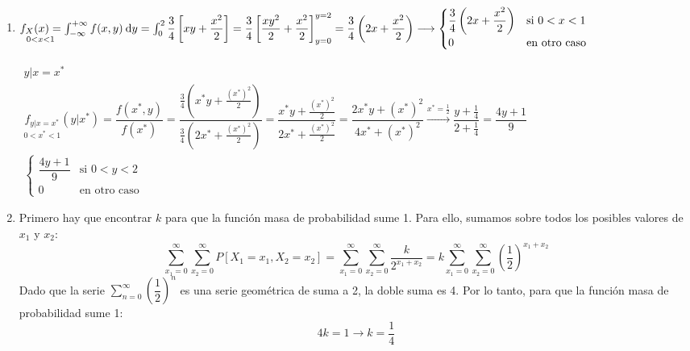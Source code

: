 \begin{enumerate}[label=\color{red}\arabic*), leftmargin=*]
	\item {}
	
	
	$\underset{0<x<1}{f_X(x)=}\int_{-\infty}^{+\infty}f(x,y)\:\mathrm{d}y=\int_{0}^{2}\dfrac{3}{4}\left[xy+\dfrac{x^2}{2}\right]=\dfrac{3}{4}\left[\dfrac{xy^2}{2}+\dfrac{x^2}{2}\right]_{y=0}^{y=2}=\dfrac{3}{4}\left(2x+\dfrac{x^2}{2}\right)\longrightarrow\begin{cases}
	\dfrac{3}{4}\left(2x+\dfrac{x^2}{2}\right) & \text{si }0<x<1\\
	0 & \text{en otro caso}
	\end{cases}$
	
	$\begin{array}{l}
	y|x=x^*\\
	\underset{0<x^*<1}{f_{y|x=x^*}}(y|x^*)=\dfrac{f(x^*,y)}{f(x^*)}=\dfrac{\frac{3}{4}\left(x^*y+\frac{(x^*)^2}{2}\right)}{\frac{3}{4}\left(2x^*+\frac{(x^*)^2}{2}\right)}=\dfrac{x^*y+\frac{(x^*)^2}{2}}{2x^*+\frac{(x^*)^2}{2}}=\dfrac{2x^*y+(x^*)^2}{4x^*+(x^*)^2}\xrightarrow{x^*=\frac{1}{2}}\dfrac{y+\frac{1}{4}}{2+\frac{1}{4}}=\dfrac{4y+1}{9}\\
	\begin{cases}
	\dfrac{4y+1}{9} & \text{si }0<y<2\\
	0 & \text{en otro caso}
	\end{cases}
	\end{array}$
	\item {}
	
	Primero hay que encontrar $k$ para que la función masa de probabilidad sume 1. Para ello, sumamos sobre todos los posibles valores de $x_1$ y $x_2$: \[ \sum_{x_1=0}^{\infty}\sum_{x_2=0}^{\infty}P[X_1=x_1,X_2=x_2]=\sum_{x_1=0}^{\infty}\sum_{x_2=0}^{\infty}\dfrac{k}{2^{x_1+x_2}}=k\sum_{x_1=0}^{\infty}\sum_{x_2=0}^{\infty}\left(\dfrac{1}{2}\right)^{x_1+x_2} \]
	Dado que la serie $\sum_{n=0}^{\infty}\left(\dfrac{1}{2}\right)^n$ es una serie geométrica de suma a 2, la doble suma es 4. Por lo tanto, para que la función masa de probabilidad sume 1: \[ 4k=1\longrightarrow k=\dfrac{1}{4} \]
	

\end{enumerate}
